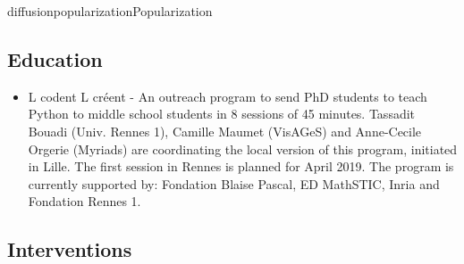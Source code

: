 \documentclass{ra2018}
\begin{document}
\begin{module}{diffusion}{popularization}{Popularization}
\subsection{Education}
\begin{itemize}
    \item L codent L créent - An outreach program to send PhD students to teach Python to middle school students in 8 sessions of 45 minutes. Tassadit Bouadi (Univ. Rennes 1), Camille Maumet (VisAGeS) and Anne-Cecile Orgerie (Myriads) are coordinating the local version of this program, initiated in Lille. The first session in Rennes is planned for April 2019. The program is currently supported by: Fondation Blaise Pascal, ED MathSTIC, Inria and Fondation Rennes 1.
\end{itemize}

\subsection{Interventions}



\end{module}
\end{document}
